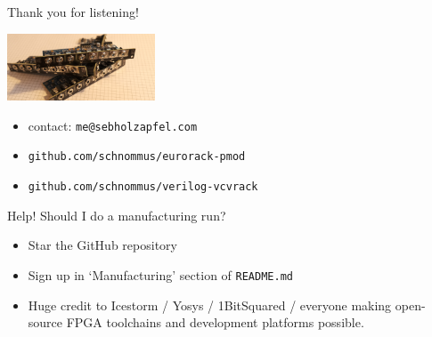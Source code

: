 \documentclass[aspectratio=169]{beamer}
\begin{document}
\begin{frame}{Thank you for listening!}

    \begin{center}
        \includegraphics[height=2cm]{img/mfg_stack.png}
    \end{center}

    \begin{itemize}
        \item contact: \texttt{me@sebholzapfel.com}
        \item \texttt{github.com/schnommus/eurorack-pmod}
        \item \texttt{github.com/schnommus/verilog-vcvrack}
    \end{itemize}

    \begin{block}{Help! Should I do a manufacturing run?}
        \begin{itemize}
            \item Star the GitHub repository
            \item Sign up in `Manufacturing' section of \texttt{README.md}
        \end{itemize}
    \end{block}

    \begin{itemize}
        \item Huge credit to Icestorm / Yosys / 1BitSquared / everyone making open-source FPGA toolchains and development platforms possible.
    \end{itemize}

\end{frame}
\end{document}
